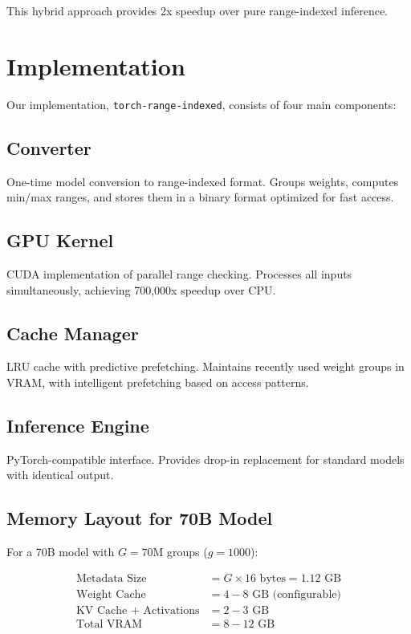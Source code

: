 \documentclass[twocolumn,10pt]{article}
\begin{document}
This hybrid approach provides 2x speedup over pure range-indexed inference.

\section{Implementation}

Our implementation, \texttt{torch-range-indexed}, consists of four main components:

\subsection{Converter}
One-time model conversion to range-indexed format. Groups weights, computes min/max ranges, and stores them in a binary format optimized for fast access.

\subsection{GPU Kernel}
CUDA implementation of parallel range checking. Processes all inputs simultaneously, achieving 700,000x speedup over CPU.

\subsection{Cache Manager}
LRU cache with predictive prefetching. Maintains recently used weight groups in VRAM, with intelligent prefetching based on access patterns.

\subsection{Inference Engine}
PyTorch-compatible interface. Provides drop-in replacement for standard models with identical output.

\subsection{Memory Layout for 70B Model}

For a 70B model with $G = 70\text{M}$ groups ($g = 1000$):

\begin{align}
\text{Metadata Size} &= G \times 16 \text{ bytes} = 1.12 \text{ GB} \\
\text{Weight Cache} &= 4-8 \text{ GB (configurable)} \\
\text{KV Cache + Activations} &= 2-3 \text{ GB} \\
\text{Total VRAM} &= 8-12 \text{ GB}
\end{align}
\end{document}
